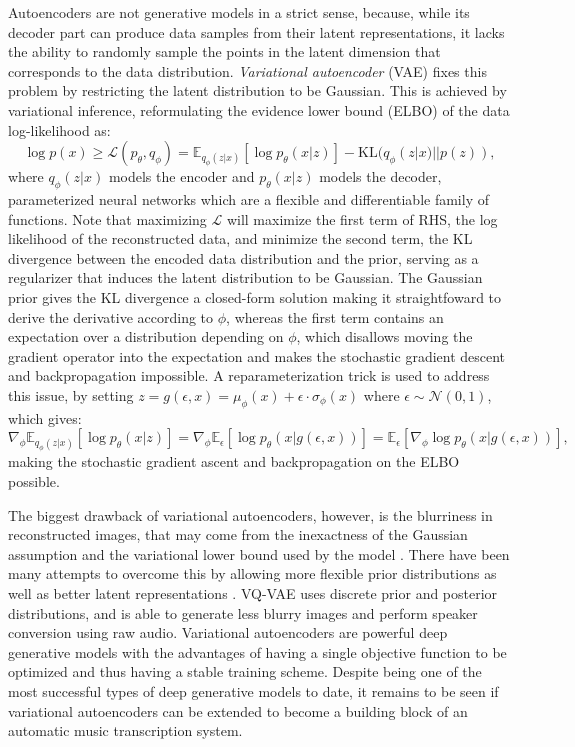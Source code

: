 Autoencoders are not generative models in a strict sense, because, while its decoder part can produce data samples from their latent representations, it lacks the ability to randomly sample the points in the latent dimension that corresponds to the data distribution.
\emph{Variational autoencoder} (VAE) \cite{kingma2013vae} fixes this problem by restricting the latent distribution to be Gaussian.
This is achieved by variational inference, reformulating the evidence lower bound (ELBO) of the data log-likelihood as:
\begin{equation}\label{eqn:vae}
\log p(x) \ge \mathcal{L}(p_\theta, q_\phi) = \mathbb{E}_{q_\phi(z|x)} [\log p_\theta(x|z)] - \mathrm{KL}(q_\phi(z|x) || p(z)),
\end{equation}
where $q_\phi(z|x)$ models the encoder and $p_\theta(x|z)$ models the decoder, parameterized neural networks which are a flexible and differentiable family of functions.
Note that maximizing $\mathcal{L}$ will maximize the first term of RHS, the log likelihood of the reconstructed data, and minimize the second term, the KL divergence between the encoded data distribution and the prior, serving as a regularizer that induces the latent distribution to be Gaussian.
The Gaussian prior gives the KL divergence a closed-form solution making it straightfoward to derive the derivative according to $\phi$, whereas the first term contains an expectation over a distribution depending on $\phi$, which disallows moving the gradient operator into the expectation and makes the stochastic gradient descent and backpropagation impossible.
A reparameterization trick is used to address this issue, by setting $z = g(\epsilon, x) = \mu_\phi(x) + \epsilon \cdot \sigma_\phi(x)$ where $\epsilon \sim \mathcal{N}(0, 1)$, which gives:
\begin{equation}\label{eqn:reparam}
\nabla_\phi \mathbb{E}_{q_\phi(z|x)} [\log p_\theta(x|z)] = \nabla_\phi \mathbb{E}_{\epsilon} [\log p_\theta(x|g(\epsilon, x))] = 
\mathbb{E}_{\epsilon} [\nabla_\phi \log p_\theta(x|g(\epsilon, x))],
\end{equation}
making the stochastic gradient ascent and backpropagation on the ELBO possible.


The biggest drawback of variational autoencoders, however, is the blurriness in reconstructed images, that may come from the inexactness of the Gaussian assumption and the variational lower bound used by the model \cite{doersch2016tutorial}.
There have been many attempts to overcome this by allowing more flexible prior distributions \cite{rezende2015flow} as well as better latent representations \cite{kingma2016iaf}.
VQ-VAE \cite{oord2017vqvae} uses discrete prior and posterior distributions, and is able to generate less blurry images and perform speaker conversion using raw audio.
Variational autoencoders are powerful deep generative models with the advantages of having a single objective function to be optimized and thus having a stable training scheme.
Despite being one of the most successful types of deep generative models to date, it remains to be seen if variational autoencoders can be extended to become a building block of an automatic music transcription system.


